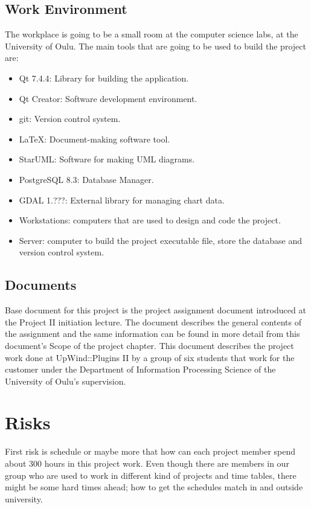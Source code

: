 \documentclass[12pt,titlepage]{article}
\begin{document}
	\subsection{Work Environment}
		The workplace is going to be a small room at the computer science labs, at the University of Oulu. The main tools that are going to be used to build the project are:
		\begin{itemize}
			\item Qt 7.4.4: Library for building the application.
			\item Qt Creator:  Software development environment.
			\item git: Version control system.
			\item \LaTeX{}: Document-making software tool.
			\item StarUML: Software for making UML diagrams.
			\item PostgreSQL 8.3: Database Manager.
			\item GDAL 1.???: External library for managing chart data.
			\item Workstations: computers that are used to design and code the project. 
			\item Server: computer to build the project executable file, store the database and version control system.
		\end{itemize}

	\subsection{Documents}
	
		Base document for this project is the project assignment document introduced at the Project II initiation lecture.
		The document describes the general contents of the assignment and the same information can be found in more detail from this document's Scope of the project chapter.
		This document describes the project work done at UpWind::Plugins II by a group of six students that work for the customer under the Department of Information Processing Science of the University of Oulu's supervision.

\section{Risks}

	First risk is schedule or maybe more that how can each project member spend about 300 hours in this project work.
	Even though there are members in our group who are used to work in different kind of projects and time tables, there might be some hard times ahead; how to get the schedules match in and outside university.
 
\end{document}
